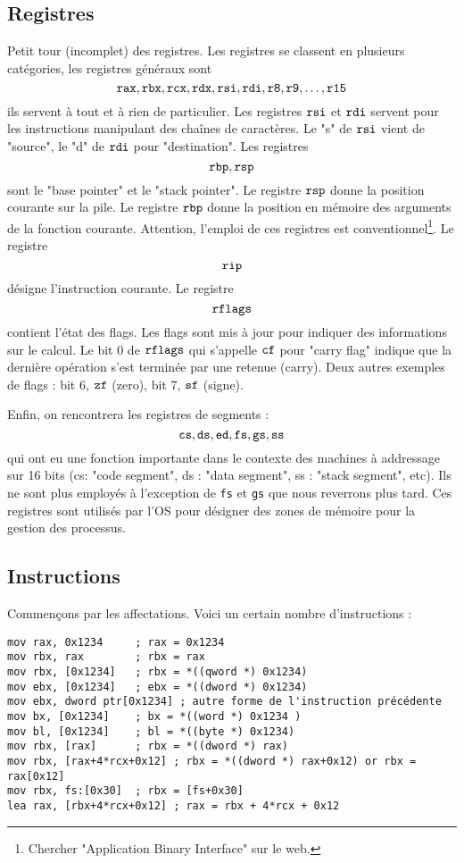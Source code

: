 \documentclass{book}
\begin{document}
{\subsection{Registres}
Petit tour (incomplet) des registres. Les registres se classent en plusieurs catégories, les registres généraux sont 
$$\tt rax, rbx, rcx, rdx, rsi, rdi, r8, r9, \ldots, r15$$
ils servent à tout et à rien de particulier. Les registres $\tt rsi$ et $\tt rdi$ servent pour les instructions manipulant des chaînes de caractères. Le "s" de $\tt rsi$ vient de "source", le "d" de $\tt rdi$ pour "destination". 
Les registres
$$\tt rbp, rsp$$
sont le "base pointer" et le "stack pointer". Le registre $\tt rsp$ donne la position courante sur la pile. Le registre $\tt rbp$ donne la position en mémoire des arguments de la fonction courante. Attention, l'emploi de ces registres est conventionnel\footnote{Chercher "Application Binary Interface" sur le web.}. 
Le registre
$$\tt rip$$
désigne l'instruction courante. Le registre 
$$\tt rflags$$
contient l'état des flags. Les flags sont mis à jour pour indiquer des informations sur le calcul. Le bit 0 de $\tt rflags$ qui s'appelle $\tt cf$ pour "carry flag" indique que la dernière opération s'est terminée par une retenue (carry). Deux autres exemples de flags  : bit 6, $\tt zf$ (zero), bit 7, $\tt sf$ (signe). 

Enfin, on rencontrera les registres de segments : 
$$\tt cs, ds, ed, fs, gs, ss$$
qui ont eu une fonction importante dans le contexte des machines à addressage sur 16 bits (cs: "code segment", ds : "data segment", ss : "stack segment", etc). Ils ne sont plus employés à l'exception de {\tt fs} et {\tt gs} que nous reverrons plus tard. Ces registres sont utilisés par l'OS pour désigner des zones de mémoire pour la gestion des processus. 

\subsection{Instructions}

Commençons par les affectations. Voici un certain nombre d'instructions :  
\begin{verbatim}
mov rax, 0x1234     ; rax = 0x1234
mov rbx, rax        ; rbx = rax
mov rbx, [0x1234]   ; rbx = *((qword *) 0x1234)
mov ebx, [0x1234]   ; ebx = *((dword *) 0x1234) 
mov ebx, dword ptr[0x1234] ; autre forme de l'instruction précédente
mov bx, [0x1234]    ; bx = *((word *) 0x1234 )
mov bl, [0x1234]    ; bl = *((byte *) 0x1234)
mov rbx, [rax]      ; rbx = *((dword *) rax)
mov rbx, [rax+4*rcx+0x12] ; rbx = *((dword *) rax+0x12) or rbx = rax[0x12]
mov rbx, fs:[0x30]  ; rbx = [fs+0x30]
lea rax, [rbx+4*rcx+0x12] ; rax = rbx + 4*rcx + 0x12
\end{verbatim}

}
\end{document}
